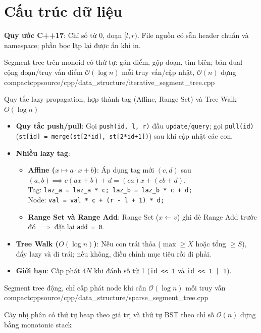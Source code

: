 \section{Cấu trúc dữ liệu}
\noindent\textbf{Quy ước C++17}: Chỉ số từ 0, đoạn $[l,r)$. File nguồn có sẵn header chuẩn và namespace; phần bọc lặp lại được ẩn khi in.

{Segment tree trên monoid có thứ tự: gán điểm, gộp đoạn, tìm biên; bản dual cộng đoạn/truy vấn điểm}
{$\mathcal{O}(\log n)$ mỗi truy vấn/cập nhật, $\mathcal{O}(n)$ dựng}
{compactcpp}{source/cpp/data_structure/iterative_segment_tree.cpp}


{Quy tắc lazy propagation, hợp thành tag (Affine, Range Set) và Tree Walk $O(\log n)$}
{}
{}{}

\begin{itemize}
    \item \textbf{Quy tắc push/pull}: Gọi \texttt{push(id, l, r)} đầu \texttt{update}/\texttt{query}; gọi \texttt{pull(id)} (\texttt{st[id] = merge(st[2*id], st[2*id+1])}) sau khi cập nhật các con.
    \item \textbf{Nhiều lazy tag}:
    \begin{itemize}
        \item \textbf{Affine ($x \mapsto a \cdot x + b$)}: Áp dụng tag mới $(c,d)$ sau $(a,b) \implies c(ax+b)+d = (ca)x + (cb+d)$. \\ Tag: \texttt{laz\_a = laz\_a * c; laz\_b = laz\_b * c + d;} \\ Node: \texttt{val = val * c + (r - l + 1) * d;}
        \item \textbf{Range Set và Range Add}: Range Set ($x \leftarrow v$) ghi đè Range Add trước đó $\implies$ đặt lại \texttt{add = 0}.
    \end{itemize}
    \item \textbf{Tree Walk ($O(\log n)$)}: Nếu con trái thỏa ($\max \ge X$ hoặc tổng $\ge S$), đẩy lazy và đi trái; nếu không, điều chỉnh mục tiêu rồi đi phải.
    \item \textbf{Giới hạn}: Cấp phát $4N$ khi đánh số từ 1 (\texttt{id << 1} và \texttt{id << 1 | 1}).
\end{itemize}



{Segment tree động, chỉ cấp phát node khi cần}
{$\mathcal{O}(\log n)$ mỗi truy vấn}
{compactcpp}{source/cpp/data_structure/sparse_segment_tree.cpp}

{Cây nhị phân có thứ tự heap theo giá trị và thứ tự BST theo chỉ số}
{$\mathcal{O}(n)$ dựng bằng monotonic stack}
{}{}

